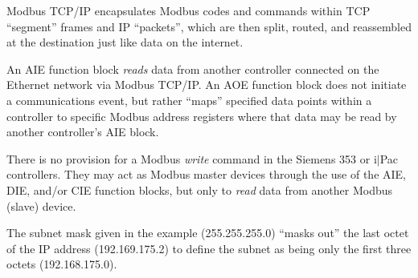 












Modbus TCP/IP encapsulates Modbus codes and commands within TCP ``segment'' frames and IP ``packets'', which are then split, routed, and reassembled at the destination just like data on the internet.

\vskip 10pt

An AIE function block {\it reads} data from another controller connected on the Ethernet network via Modbus TCP/IP.  An AOE function block does not initiate a communications event, but rather ``maps'' specified data points within a controller to specific Modbus address registers where that data may be read by another controller's AIE block.

There is no provision for a Modbus {\it write} command in the Siemens 353 or i$|$Pac controllers.  They may act as Modbus master devices through the use of the AIE, DIE, and/or CIE function blocks, but only to {\it read} data from another Modbus (slave) device.

\vskip 10pt

The subnet mask given in the example (255.255.255.0) ``masks out'' the last octet of the IP address (192.169.175.2) to define the subnet as being only the first three octets (192.168.175.0).




